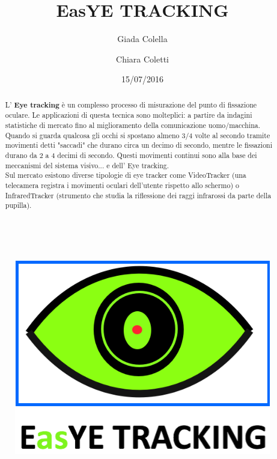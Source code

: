 \documentclass[12pt]{article}
\title{\textbf{EasYE TRACKING}}
\author{Giada Colella \and Chiara Coletti}
\date{15/07/2016}
\begin{document}
	
\begin{figure}
\centering
\includegraphics[width=15cm,height=10cm]{EasYE_TRACKING_logob}
\end{figure}

\maketitle
\pagebreak

\tableofcontents

\pagebreak

\begin{abstract}
	L' \textbf{Eye tracking} \`e un complesso processo di misurazione del punto di fissazione oculare. Le applicazioni di questa tecnica sono molteplici: a partire da indagini statistiche di mercato fino al miglioramento della comunicazione uomo/macchina.\\
	Quando si guarda qualcosa gli occhi si spostano almeno 3/4 volte al secondo tramite movimenti detti "saccadi" che durano circa un decimo di secondo, mentre le fissazioni durano da 2 a 4 decimi di secondo. Questi movimenti continui sono alla base dei meccanismi del sistema visivo... e dell' Eye tracking. \\
	Sul mercato esistono diverse tipologie di eye tracker come VideoTracker (una telecamera registra i movimenti oculari dell'utente rispetto allo schermo) o InfraredTracker (strumento che studia la riflessione dei raggi infrarossi da parte della pupilla).
\end{abstract}
\pagebreak
\end{document}
